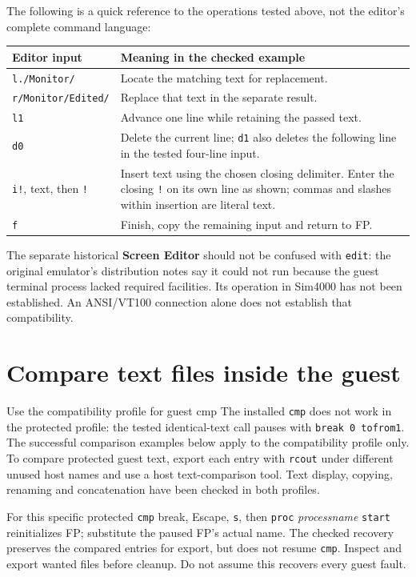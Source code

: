 The following is a quick reference to the operations tested above, not the
editor's complete command language:

\begin{longtable}{@{}>{\raggedright\arraybackslash}p{}
  >{\raggedright\arraybackslash}p{}@{}}
\toprule
Editor input & Meaning in the checked example \\
\midrule
\endhead
\bottomrule
\endlastfoot
\texttt{l./Monitor/} & Locate the matching text for replacement. \\
\texttt{r/Monitor/Edited/} & Replace that text in the separate result. \\
\texttt{l1} & Advance one line while retaining the passed text. \\
\texttt{d0} & Delete the current line; \texttt{d1} also deletes the following line in the tested four-line input. \\
\texttt{i!}, text, then \texttt{!} & Insert text using the chosen closing delimiter. Enter the closing \texttt{!} on its own line as shown; commas and slashes within insertion are literal text. \\
\texttt{f} & Finish, copy the remaining input and return to FP. \\
\end{longtable}

The separate historical \textbf{Screen Editor} should not be confused with \passthrough{\lstinline!edit!}: the original emulator's distribution notes say it could not run because the guest terminal process lacked required facilities. Its operation in Sim4000 has not been established. An ANSI/VT100 connection alone does not establish that compatibility.

\section{Compare text files inside the guest}\label{compare-text-files-inside-the-guest}

\begin{operationnote}{Use the compatibility profile for guest cmp}
The installed \texttt{cmp} does not work in the protected profile: the tested
identical-text call pauses with \texttt{break 0 tofrom1}. The successful
comparison examples below apply to the compatibility profile only. To compare
protected guest text, export each entry with \texttt{rcout} under different
unused host names and use a host text-comparison tool. Text display, copying,
renaming and concatenation have been checked in both profiles.

For this specific protected \texttt{cmp} break, Escape, \texttt{s}, then
\texttt{proc} \textit{processname} \texttt{start} reinitializes FP; substitute
the paused FP's actual name. The checked recovery preserves the compared
entries for export, but does not resume \texttt{cmp}. Inspect and export wanted
files before cleanup. Do not assume this recovers every guest fault.
\end{operationnote}

